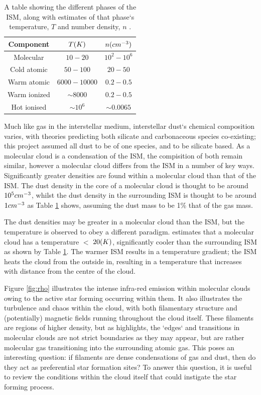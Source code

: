 \documentclass{report}
\begin{document}
\begin{table}[h]
  \centering
   \begin{tabular}{||c c c||}
   \hline
   Component & $T\/(K)$ & $n\/(cm^{-3})$ \\ [0.5ex]
   \hline\hline
   Molecular    & $10-20$      & $10^{2}-10^{6}$ \\
   \hline
   Cold atomic  & $50-100$     & $20-50$ \\
   \hline
   Warm atomic  & $6000-10000$ & $0.2-0.5$ \\
   \hline
   Warm ionized & $\sim8000$    & $0.2-0.5$ \\
   \hline
   Hot ionised  & $\sim10^{6}$  & $\sim0.0065$ \\ [1ex]
   \hline
   \end{tabular}
   \caption{A table showing the different phases of the ISM, along with estimates of that phase`s temperature, $T$ and number density, $n$ \parencite{ism}.}
   \label{table:ism}
\end{table}

Much like gas in the interstellar medium, interstellar dust`s chemical composition varies, with theories predicting both silicate and carbonaceous species co-existing; this project assumed all dust to be of one species, and to be silicate based. As a molecular cloud is a condensation of the ISM, the compisition of both remain similar, however a molecular cloud differs from the ISM in a number of key ways. Significantly greater densities are found within a molecular cloud than that of the ISM. The dust density in the core of a molecular cloud is thought to be around $10^{5}\/cm^{-3}$, whilst the dust density in the surrounding ISM is thought to be around $1\/cm^{-3}$ as Table \ref{table:ism} shows, assuming the dust mass to be 1\% that of the gas mass.

The dust densities may be greater in a molecular cloud than the ISM, but the temperature is observed to obey a different paradigm. \textcite{dustopacity} estimates that a molecular cloud has a temperature $<$ $20\/(K)$, significantly cooler than the surrounding ISM as shown by Table \ref{table:ism}. The warmer ISM results in a temperature gradient; the ISM heats the cloud from the outside in, resulting in a temperature that increases with distance from the centre of the cloud.

Figure \ref{fig:rho} illustrates the intense infra-red emission within molecular clouds owing to the active star forming occurring within them. It also illustrates the turbulence and chaos within the cloud, with both filamentary structure and (potentially) magnetic fields running throughout the cloud itself. These filaments are regions of higher density, but as \textcite{evo-mol} highlights, the `edges` and transitions in molecular clouds are not strict boundaries as they may appear, but are rather molecular gas transitioning into the surrounding atomic gas. This poses an interesting question: if filaments are dense condensations of gas and dust, then do they act as preferential star formation sites? To answer this question, it is useful to review the conditions within the cloud itself that could instigate the star forming process.
\end{document}
